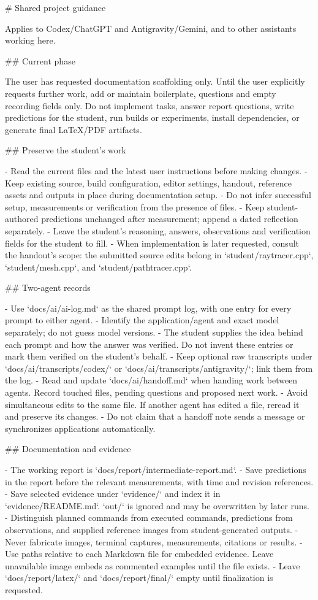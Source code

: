 \documentclass[11pt,a4paper]{article}
\begin{document}
\begin{prompt}
# Shared project guidance

Applies to Codex/ChatGPT and Antigravity/Gemini, and to other assistants working here.

## Current phase

The user has requested documentation scaffolding only. Until the user explicitly requests
 further work, add or maintain boilerplate, questions and empty recording fields only. Do
 not implement tasks, answer report questions, write predictions for the student, run
builds or experiments, install dependencies, or generate final LaTeX/PDF artifacts.

## Preserve the student's work

- Read the current files and the latest user instructions before making changes.
- Keep existing source, build configuration, editor settings, handout, reference assets
and outputs in place during documentation setup.
- Do not infer successful setup, measurements or verification from the presence of files.
- Keep student-authored predictions unchanged after measurement; append a dated
reflection separately.
- Leave the student's reasoning, answers, observations and verification fields for the
student to fill.
- When implementation is later requested, consult the handout's scope: the submitted
source edits belong in `student/raytracer.cpp`, `student/mesh.cpp`, and
`student/pathtracer.cpp`.

## Two-agent records

- Use `docs/ai/ai-log.md` as the shared prompt log, with one entry for every prompt to
either agent.
- Identify the application/agent and exact model separately; do not guess model versions.
- The student supplies the idea behind each prompt and how the answer was verified. Do
not invent these entries or mark them verified on the student's behalf.
- Keep optional raw transcripts under `docs/ai/transcripts/codex/` or
`docs/ai/transcripts/antigravity/`; link them from the log.
- Read and update `docs/ai/handoff.md` when handing work between agents. Record touched
files, pending questions and proposed next work.
- Avoid simultaneous edits to the same file. If another agent has edited a file, reread
it and preserve its changes.
- Do not claim that a handoff note sends a message or synchronizes applications
automatically.

## Documentation and evidence

- The working report is `docs/report/intermediate-report.md`.
- Save predictions in the report before the relevant measurements, with time and revision
 references.
- Save selected evidence under `evidence/` and index it in `evidence/README.md`. `out/`
is ignored and may be overwritten by later runs.
- Distinguish planned commands from executed commands, predictions from observations, and
 supplied reference images from student-generated outputs.
- Never fabricate images, terminal captures, measurements, citations or results.
- Use paths relative to each Markdown file for embedded evidence. Leave unavailable image
 embeds as commented examples until the file exists.
- Leave `docs/report/latex/` and `docs/report/final/` empty until finalization is
requested.


\end{prompt}
\end{document}
